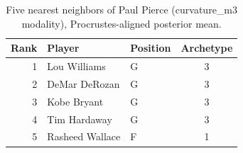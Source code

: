 \begin{table}[htbp]
  \centering\small
  \begin{tabular}{rllc}
    \toprule
    Rank & Player & Position & Archetype \\
    \midrule
    1 & Lou Williams & G & 3 \\
    2 & DeMar DeRozan & G & 3 \\
    3 & Kobe Bryant & G & 3 \\
    4 & Tim Hardaway & G & 3 \\
    5 & Rasheed Wallace & F & 1 \\
    \bottomrule
  \end{tabular}
  \caption{Five nearest neighbors of Paul Pierce (curvature_m3 modality), Procrustes-aligned posterior mean.}
  \label{tab:Paul_Pierce_neighbors_curvature_m3}
\end{table}

